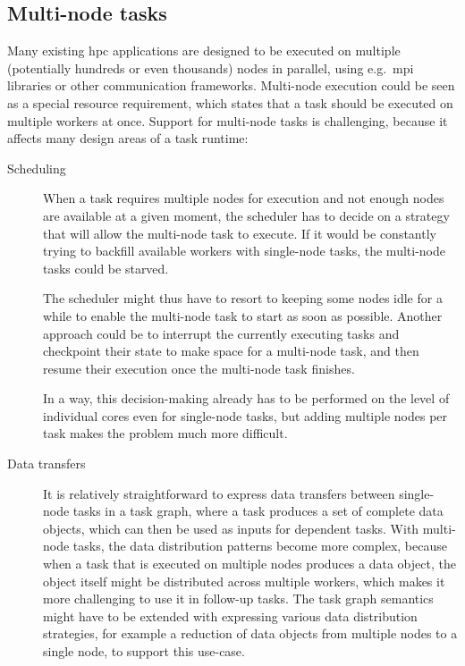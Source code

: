\subsection{Multi-node tasks}
Many existing \gls{hpc} applications are designed to be executed on multiple
(potentially hundreds or even thousands) nodes in parallel, using e.g.\ \gls{mpi}
libraries or other communication frameworks. Multi-node execution could be seen as a special
resource requirement, which states that a task should be executed on multiple workers at once.
Support for multi-node tasks is challenging, because it affects many design areas of a task
runtime:
\begin{description}
	\item[Scheduling] When a task requires multiple nodes for execution and not enough nodes are available at a given
		moment, the scheduler has to decide on a strategy that will allow the multi-node task to execute.
		If it would be constantly trying to backfill available workers with single-node tasks, the
		multi-node tasks could be starved.

		The scheduler might thus have to resort to keeping some nodes idle for a while to enable the
		multi-node task to start as soon as possible. Another approach could be to interrupt the currently
		executing tasks and checkpoint their state to make space for a multi-node task, and then resume
		their execution once the multi-node task finishes.

		In a way, this decision-making already has to be performed on the level of individual cores even
		for single-node tasks, but adding multiple nodes per task makes the problem much more difficult.
	\item[Data transfers] It is relatively straightforward to express data transfers between single-node tasks in a task
		graph, where a task produces a set of complete data objects, which can then be used as inputs for
		dependent tasks. With multi-node tasks, the data distribution patterns become more complex, because
		when a task that is executed on multiple nodes produces a data object, the object itself might be
		distributed across multiple workers, which makes it more challenging to use it in follow-up tasks.
		The task graph semantics might have to be extended with expressing various data distribution
		strategies, for example a reduction of data objects from multiple nodes to a single node, to
		support this use-case.


\end{description}
